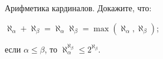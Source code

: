 Арифметика кардиналов. Докажите, что:
\begin{enumcyr}
    \item $\aleph_{\alpha} + \aleph_{\beta} = \aleph_{\alpha}  \aleph_{\beta} = \max(\aleph_{\alpha},
        \aleph_{\beta})$;
    \item если $\alpha \le \beta$, то $\aleph_{\alpha}^{\aleph_{\beta}} \le 2^{\aleph_{\beta}}$.       
\end{enumcyr}